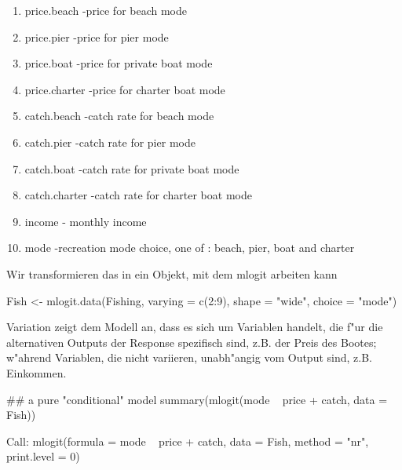 \documentclass[a4paper,twoside]{tufte-book}\usepackage[]{graphicx}\usepackage[]{color}
\begin{document}
\begin{appendices}
\begin{enumerate}
\setlength\itemsep{-0.5em}
\item price.beach -price for beach mode

\item price.pier -price for pier mode

\item price.boat -price for private boat mode

\item price.charter -price for charter boat mode

\item catch.beach -catch rate for beach mode

\item catch.pier -catch rate for pier mode

\item catch.boat -catch rate for private boat mode

\item catch.charter -catch rate for charter boat mode

\item income - monthly income

\item mode -recreation mode choice, one of : beach, pier, boat and charter

\end{enumerate}

Wir transformieren das in ein Objekt, mit dem mlogit arbeiten kann


\begin{Schunk}
\begin{Sinput}
Fish <- mlogit.data(Fishing, varying = c(2:9), shape = "wide", choice = "mode")
\end{Sinput}
\end{Schunk}


Variation zeigt dem Modell an, dass es sich um Variablen handelt, die f"ur die alternativen Outputs der Response spezifisch sind, z.B. der Preis des Bootes; w"ahrend Variablen, die nicht variieren, unabh"angig vom Output sind, z.B. Einkommen.


\begin{Schunk}
\begin{Sinput}
## a pure "conditional" model
summary(mlogit(mode ~ price + catch, data = Fish))
\end{Sinput}
\begin{Soutput}

Call:
mlogit(formula = mode ~ price + catch, data = Fish, method = "nr", 
    print.level = 0)


\end{Soutput}
\end{Schunk}
\end{appendices}
\end{document}
